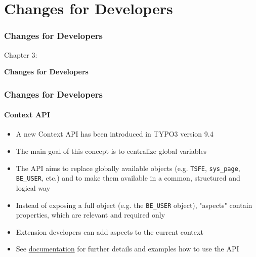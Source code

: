 %

\section{Changes for Developers}
\begin{frame}[fragile]
	\frametitle{Changes for Developers}

	\begin{center}\huge{Chapter 3:}\end{center}
	\begin{center}\huge{\color{typo3darkgrey}\textbf{Changes for Developers}}\end{center}

\end{frame}


\begin{frame}[fragile]
	\frametitle{Changes for Developers}
	\framesubtitle{Context API}

	\begin{itemize}
		\item A new Context API has been introduced in TYPO3 version 9.4
		\item The main goal of this concept is to centralize global variables
		\item The API aims to replace globally available objects (e.g.
			\texttt{TSFE}, \texttt{sys\_page}, \texttt{BE\_USER}, etc.) and to
			make them available in a common, structured and logical way
		\item Instead of exposing a full object (e.g. the \texttt{BE\_USER}
			object), "aspects" contain properties, which are relevant and
			required only
		\item Extension developers can add aspects to the current context
		\item See \href{https://docs.typo3.org/typo3cms/extensions/core/latest/Changelog/9.4/Feature-85389-ContextAPIForConsistentDataHandling.html}{documentation}
			for further details and examples how to use the API
	\end{itemize}

\end{frame}

